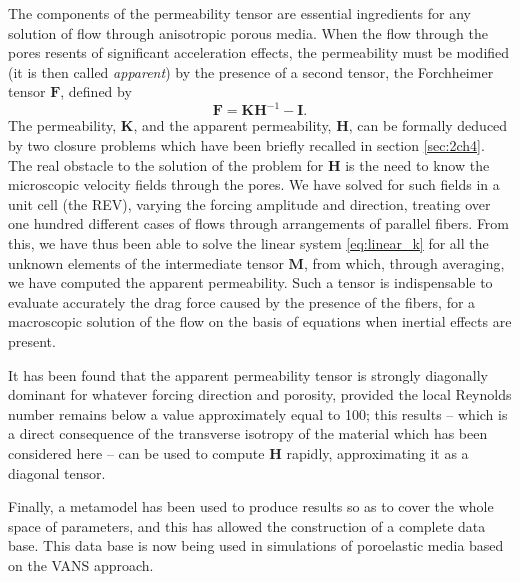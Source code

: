 The components of the permeability tensor are essential ingredients for any solution of flow
through anisotropic porous media.  When the flow through the pores resents of significant
acceleration effects, the permeability must be modified (it is then called \emph{apparent}) by the presence
of a second tensor, the Forchheimer tensor $\mathbf{F}$, defined by   
$$
\mathbf{F} =  \mathbf{K} \mathbf{H}^{-1} - \mathbf{I}.
$$
The permeability, $\mathbf{K}$, and the apparent permeability, $\mathbf{H}$, can be formally deduced by two closure problems which have
been briefly recalled in section \ref{sec:2ch4}.  The real obstacle to the solution of the problem for $\mathbf{H}$ is the need
to know the microscopic velocity fields through the pores. We have solved for such fields 
in a unit cell (the REV), varying the forcing amplitude and direction, treating over one
hundred different cases of flows through arrangements of parallel fibers. From this, we have
thus been able to solve the linear system \eqref{eq:linear_k} for all the unknown elements of the 
intermediate tensor  
$\mathbf{M}$, from which, through averaging, we have computed the apparent permeability.  Such a tensor
is  indispensable to evaluate accurately the drag force caused by the presence of the fibers, for a macroscopic solution of the flow on the
basis of equations \cite{whitaker2013method} when inertial effects are present.

It has been found that the apparent permeability tensor is strongly diagonally dominant for whatever
forcing direction and porosity,  provided the local Reynolds number remains below a value 
approximately equal to 100; this results -- which is a direct
consequence of the transverse isotropy of the material which has been considered here -- 
can be used to compute $\mathbf{H}$ rapidly, approximating it as a diagonal tensor.

Finally, a metamodel has been used to produce results so as to cover the whole space of parameters,
and this has allowed the construction of a complete data base.  This data base is now being used in simulations of poroelastic media based on the VANS approach. 

